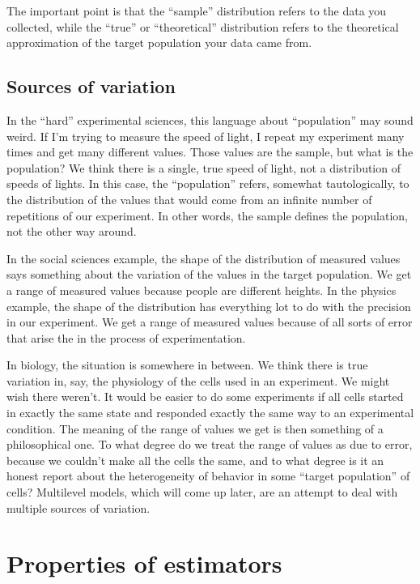 The important point is that the ``sample'' distribution refers to the data you
collected, while the ``true'' or ``theoretical'' distribution refers to the
theoretical approximation of the target population your data came from.

\subsection{Sources of variation}

In the ``hard'' experimental sciences, this language about ``population'' may
sound weird. If I'm trying to measure the speed of light, I repeat my
experiment many times and get many different values. Those values are the
sample, but what is the population? We think there is a single, true speed of
light, not a distribution of speeds of lights. In this case, the ``population''
refers, somewhat tautologically, to the distribution of the values that would
come from an infinite number of repetitions of our experiment. In other words,
the sample defines the population, not the other way around.

In the social sciences example, the shape of the distribution of measured
values says something about the variation of the values in the target
population. We get a range of measured values because people are different
heights. In the physics example, the shape of the distribution has everything lot to do
with the precision in our experiment. We get a range of measured values
because of all sorts of error that arise the in the process of experimentation.

In biology, the situation is somewhere in between. We think there is true
variation in, say, the physiology of the cells used in an experiment. We
might wish there weren't. It would be easier to do some experiments if all
cells started in exactly the same state and responded exactly the same way to
an experimental condition. The meaning of the range of values we get is then
something of a philosophical one. To what degree do we treat the range of
values as due to error, because we couldn't make all the cells the same, and
to what degree is it an honest report about the heterogeneity of behavior in
some ``target population'' of cells? Multilevel models, which will come up later,
are an attempt to deal with multiple sources of variation.

\section{Properties of estimators}

